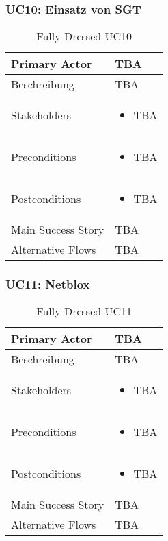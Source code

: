 \subsubsection{UC10: Einsatz von SGT}
\begin{table}[H]
	\centering
	\begin{tabularx}{\textwidth}{l | X}
		Primary Actor   & TBA        \\
		\hline
		Beschreibung   & TBA  \\ 
		\hline
		Stakeholders       & 
		\begin{itemize}
			\item TBA
		\end{itemize} \\ 
		Preconditions      &
		\begin{itemize}	
			\item TBA
		\end{itemize}  \\
		\hline
		Postconditions     & 
		\begin{itemize}	
			\item TBA
		\end{itemize}  \\
		\hline
		Main Success Story & TBA
		\newline
		\\
		\hline
		Alternative Flows  & 
		TBA \newline
		\newline
	\end{tabularx}
	\caption{Fully Dressed UC10}
	\label{tab:UC10}
\end{table}

\subsubsection{UC11: Netblox}
\begin{table}[H]
	\centering
	\begin{tabularx}{\textwidth}{l | X}
		Primary Actor   & TBA        \\
		\hline
		Beschreibung   & TBA  \\ 
		\hline
		Stakeholders       & 
		\begin{itemize}
			\item TBA
		\end{itemize} \\ 
		Preconditions      &
		\begin{itemize}	
			\item TBA
		\end{itemize}  \\
		\hline
		Postconditions     & 
		\begin{itemize}	
			\item TBA
		\end{itemize}  \\
		\hline
		Main Success Story & TBA
		\newline
		\\
		\hline
		Alternative Flows  & 
		TBA \newline
		\newline
	\end{tabularx}
	\caption{Fully Dressed UC11}
	\label{tab:UC11}
\end{table}

